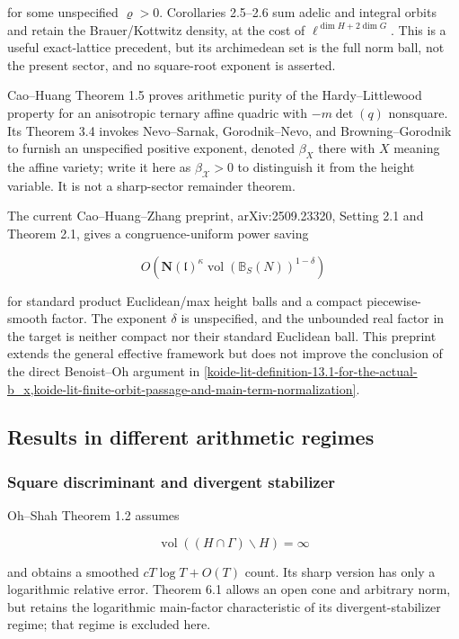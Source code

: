 for some unspecified \(\varrho>0\). Corollaries 2.5--2.6 sum adelic and integral orbits and retain the Brauer/Kottwitz density, at the cost of \(\ell^{\dim H+2\dim G}\). This is a useful exact-lattice precedent, but its archimedean set is the full norm ball, not the present sector, and no square-root exponent is asserted.

Cao--Huang Theorem 1.5 proves arithmetic purity of the Hardy--Littlewood property for an anisotropic ternary affine quadric with \(-m\det(q)\) nonsquare. Its Theorem 3.4 invokes Nevo--Sarnak, Gorodnik--Nevo, and Browning--Gorodnik to furnish an unspecified positive exponent, denoted \(\beta_X\) there with \(X\) meaning the affine variety; write it here as \(\beta_{\mathscr X}>0\) to distinguish it from the height variable. It is not a sharp-sector remainder theorem.

The current Cao--Huang--Zhang preprint, arXiv:2509.23320, Setting 2.1 and Theorem 2.1, gives a congruence-uniform power saving

\[
 O\!\left(\mathbf N(\mathfrak l)^\kappa
 \operatorname{vol}(\mathbb B_S(N))^{1-\delta}\right)
\]

for standard product Euclidean/max height balls and a compact piecewise-smooth factor. The exponent \(\delta\) is unspecified, and the unbounded real factor in the target is neither compact nor their standard Euclidean ball. This preprint extends the general effective framework but does not improve the conclusion of the direct Benoist--Oh argument in \cref{koide-lit-definition-13.1-for-the-actual-b_x,koide-lit-finite-orbit-passage-and-main-term-normalization}.

\subsection{Results in different arithmetic regimes}\label{koide-lit-results-in-different-arithmetic-regimes}

\subsubsection{Square discriminant and divergent stabilizer}\label{koide-lit-square-discriminant-and-divergent-stabilizer}

Oh--Shah Theorem 1.2 assumes

\[
 \operatorname{vol}((H\cap\Gamma)\backslash H)=\infty
\]

and obtains a smoothed \(cT\log T+O(T)\) count. Its sharp version has only a logarithmic relative error. Theorem 6.1 allows an open cone and arbitrary norm, but retains the logarithmic main-factor characteristic of its divergent-stabilizer regime; that regime is excluded here.

